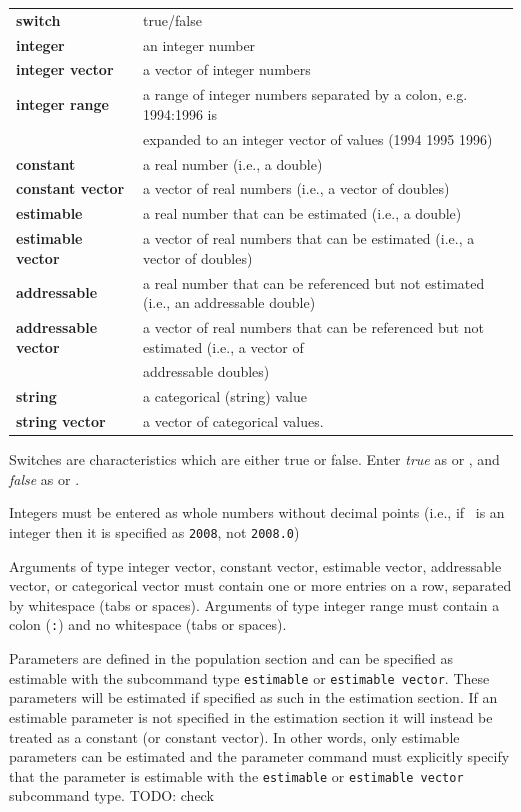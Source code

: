 \begin{tabular}{ll}
\textbf{switch} & true/false \\
\textbf{integer}& an integer number \\
\textbf{integer vector} & a vector of integer numbers \\
\textbf{integer range} & a range of integer numbers separated by a colon, e.g. 1994:1996 is \\ & expanded to an integer vector of values (1994 1995 1996) \\
\textbf{constant} & a real number (i.e., a double) \\
\textbf{constant vector} & a vector of real numbers (i.e., a vector of doubles) \\
\textbf{estimable} & a real number that can be estimated (i.e., a double) \\
\textbf{estimable vector} & a vector of real numbers that can be estimated (i.e., a vector of doubles) \\
\textbf{addressable} & a real number that can be referenced but not estimated (i.e., an addressable double) \\
\textbf{addressable vector} & a vector of real numbers that can be referenced but not estimated (i.e., a vector of \\ & addressable doubles) \\
\textbf{string} & a categorical (string) value \\
\textbf{string vector} & a vector of categorical values.
\end{tabular}

Switches are characteristics which are either true or false. Enter \emph{true} as  or , and \emph{false} as  or .

Integers must be entered as whole numbers without decimal points (i.e., if \ is an integer then it is specified as \texttt{2008}, not \texttt{2008.0})

Arguments of type integer vector, constant vector, estimable vector, addressable vector, or categorical vector must contain one or more entries on a row, separated by whitespace (tabs or spaces). Arguments of type integer range must contain a colon (\texttt{:}) and no whitespace (tabs or spaces).

Parameters are defined in the population section and can be specified as estimable with the subcommand type \texttt{estimable} or \texttt{estimable vector}.  These parameters will be estimated if specified as such in the estimation section. If an estimable parameter is not specified in the estimation section it will instead be treated as a constant (or constant vector). In other words, only estimable parameters can be estimated and the parameter command must explicitly specify that the parameter is estimable with the \texttt{estimable} or \texttt{estimable vector} subcommand type. TODO: check

